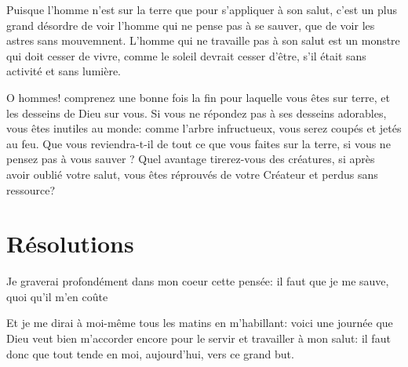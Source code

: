 \documentclass[instructions.tex]{subfiles}
\begin{document}
Puisque l'homme n'est sur la terre que pour s'appliquer à son salut, c'est un plus grand désordre de voir l'homme qui ne pense pas à se sauver, que de voir les astres sans mouvemnent. L'homme qui ne travaille pas à son salut est un monstre qui doit cesser de vivre, comme le soleil devrait cesser d'être, s'il était sans activité et sans lumière.

O hommes! comprenez une bonne fois la fin pour laquelle vous êtes sur terre, et les desseins de Dieu sur vous. Si vous ne répondez pas à ses desseins adorables, vous êtes inutiles au monde: comme l'arbre infructueux, vous serez coupés et jetés au feu. Que vous reviendra-t-il de tout ce que vous faites sur la terre, si vous ne pensez pas à vous sauver ? Quel avantage tirerez-vous des créatures, si après avoir oublié votre salut, vous êtes réprouvés de votre Créateur et perdus sans ressource?

\section{Résolutions}
\primo Je graverai profondément dans mon coeur cette pensée: il faut que je me sauve, quoi qu'il m'en coûte

\secundo Et je me dirai à moi-même tous les matins en m'habillant: \og voici une journée que Dieu veut bien m'accorder encore pour le servir et travailler à mon salut: il faut donc que tout tende en moi, aujourd'hui, vers ce grand but\fg.

\end{document}
